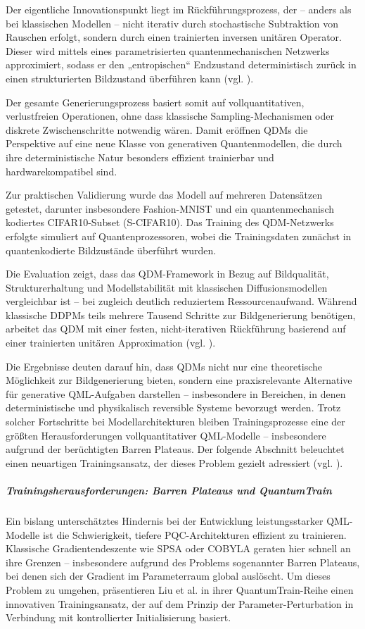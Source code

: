 Der eigentliche Innovationspunkt liegt im Rückführungsprozess, der – anders als bei klassischen Modellen – nicht iterativ durch stochastische Subtraktion von Rauschen erfolgt, sondern durch einen trainierten inversen unitären Operator. Dieser wird mittels eines parametrisierten quantenmechanischen Netzwerks approximiert, sodass er den „entropischen“ Endzustand deterministisch zurück in einen strukturierten Bildzustand überführen kann (vgl. \cite{zhangGenerativeQuantumMachine2024}).

Der gesamte Generierungsprozess basiert somit auf vollquantitativen, verlustfreien Operationen, ohne dass klassische Sampling-Mechanismen oder diskrete Zwischenschritte notwendig wären. Damit eröffnen QDMs die Perspektive auf eine neue Klasse von generativen Quantenmodellen, die durch ihre deterministische Natur besonders effizient trainierbar und hardwarekompatibel sind.

Zur praktischen Validierung wurde das Modell auf mehreren Datensätzen getestet, darunter insbesondere Fashion-MNIST und ein quantenmechanisch kodiertes CIFAR10-Subset (S-CIFAR10). Das Training des QDM-Netzwerks erfolgte simuliert auf Quantenprozessoren, wobei die Trainingsdaten zunächst in quantenkodierte Bildzustände überführt wurden.

Die Evaluation zeigt, dass das QDM-Framework in Bezug auf Bildqualität, Strukturerhaltung und Modellstabilität mit klassischen Diffusionsmodellen vergleichbar ist – bei zugleich deutlich reduziertem Ressourcenaufwand. Während klassische DDPMs teils mehrere Tausend Schritte zur Bildgenerierung benötigen, arbeitet das QDM mit einer festen, nicht-iterativen Rückführung basierend auf einer trainierten unitären Approximation (vgl. \cite{zhangGenerativeQuantumMachine2024}).

Die Ergebnisse deuten darauf hin, dass QDMs nicht nur eine theoretische Möglichkeit zur Bildgenerierung bieten, sondern eine praxisrelevante Alternative für generative QML-Aufgaben darstellen – insbesondere in Bereichen, in denen deterministische und physikalisch reversible Systeme bevorzugt werden.
Trotz solcher Fortschritte bei Modellarchitekturen bleiben Trainingsprozesse eine der größten Herausforderungen vollquantitativer QML-Modelle – insbesondere aufgrund der berüchtigten Barren Plateaus. Der folgende Abschnitt beleuchtet einen neuartigen Trainingsansatz, der dieses Problem gezielt adressiert (vgl. \cite{zhangGenerativeQuantumMachine2024}).

\subparagraph{Trainingsherausforderungen: Barren Plateaus und QuantumTrain}
Ein bislang unterschätztes Hindernis bei der Entwicklung leistungsstarker QML-Modelle ist die Schwierigkeit, tiefere PQC-Architekturen effizient zu trainieren. Klassische Gradientendeszente wie SPSA oder COBYLA geraten hier schnell an ihre Grenzen – insbesondere aufgrund des Problems sogenannter Barren Plateaus, bei denen sich der Gradient im Parameterraum global auslöscht. Um dieses Problem zu umgehen, präsentieren Liu et al. \cite{liuQuantumTrainRethinkingHybrid2024} in ihrer QuantumTrain-Reihe einen innovativen Trainingsansatz, der auf dem Prinzip der Parameter-Perturbation in Verbindung mit kontrollierter Initialisierung basiert.

